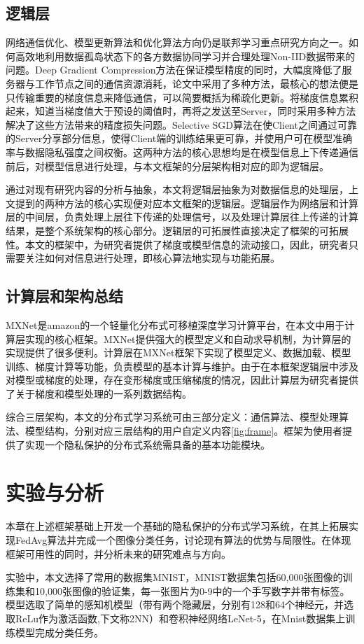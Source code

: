 \documentclass[zihao = -4,cn]{oucart}
\begin{document}
\subsection{逻辑层}
网络通信优化、模型更新算法和优化算法方向仍是联邦学习重点研究方向之一。如何高效地利用数据孤岛状态下的各方数据协同学习并合理处理Non-IID数据带来的问题。Deep Gradient Compression\cite{lin2017deep}方法在保证模型精度的同时，大幅度降低了服务器与工作节点之间的通信资源消耗，论文中采用了多种方法，最核心的想法便是只传输重要的梯度信息来降低通信，可以简要概括为稀疏化更新。将梯度信息累积起来，知道当梯度值大于预设的阈值时，再将之发送至Server，同时采用多种方法解决了这些方法带来的精度损失问题。Selective SGD\cite{shokri2015privacy}算法在使Client之间通过可靠的Server分享部分信息，使得Client端的训练结果更可靠，并使用户可在模型准确率与数据隐私强度之间权衡。这两种方法的核心思想均是在模型信息上下传递通信前后，对模型信息进行处理，与本文框架的分层架构相对应的即为逻辑层。\par
通过对现有研究内容的分析与抽象，本文将逻辑层抽象为对数据信息的处理层，上文提到的两种方法的核心实现便对应本文框架的逻辑层。逻辑层作为网络层和计算层的中间层，负责处理上层往下传递的处理信号，以及处理计算层往上传递的计算结果，是整个系统架构的核心部分。逻辑层的可拓展性直接决定了框架的可拓展性。本文的框架中，为研究者提供了梯度或模型信息的流动接口，因此，研究者只需要关注如何对信息进行处理，即核心算法地实现与功能拓展。\par
\subsection{计算层和架构总结}
MXNet是amazon的一个轻量化分布式可移植深度学习计算平台，在本文中用于计算层实现的核心框架。MXNet提供强大的模型定义和自动求导机制，为计算层的实现提供了很多便利。计算层在MXNet框架下实现了模型定义、数据加载、模型训练、梯度计算等功能，负责模型的基本计算与维护。由于在本框架逻辑层中涉及对模型或梯度的处理，存在变形梯度或压缩梯度的情况，因此计算层为研究者提供了关于梯度和模型处理的一系列数据结构。\par
综合三层架构，本文的分布式学习系统可由三部分定义：通信算法、模型处理算法、模型结构，分别对应三层结构的用户自定义内容\ref{fig:frame}。框架为使用者提供了实现一个隐私保护的分布式系统需具备的基本功能模块。\par


\section{实验与分析}
本章在上述框架基础上开发一个基础的隐私保护的分布式学习系统，在其上拓展实现FedAvg算法并完成一个图像分类任务，讨论现有算法的优势与局限性。在体现框架可用性的同时，并分析未来的研究难点与方向。\par
实验中，本文选择了常用的数据集MNIST，MNIST数据集包括60,000张图像的训练集和10,000张图像的验证集，每一张图片为0-9中的一个手写数字并带有标签。模型选取了简单的感知机模型（带有两个隐藏层，分别有128和64个神经元，并选取ReLu作为激活函数,下文称2NN）和卷积神经网络LeNet-5\cite{lecun2015lenet}，在Mnist数据集上训练模型完成分类任务。\par
\end{document}
